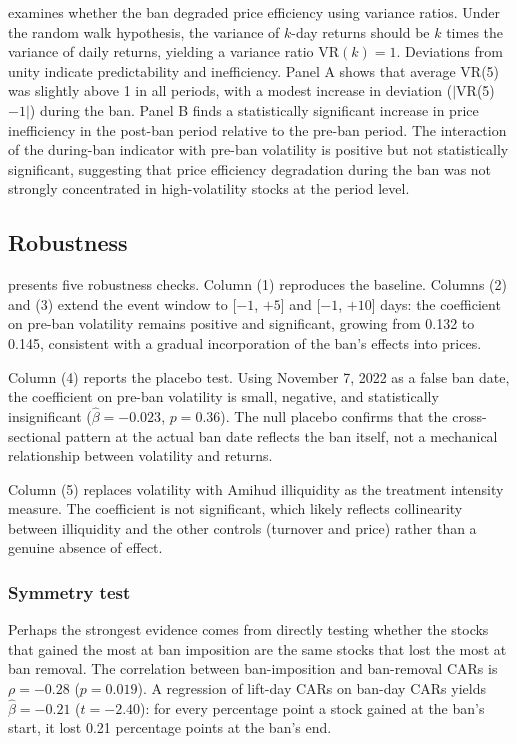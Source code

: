 \documentclass[12pt]{article}
\begin{document}


 examines whether the ban degraded price efficiency using variance ratios. Under the random walk hypothesis, the variance of $k$-day returns should be $k$ times the variance of daily returns, yielding a variance ratio VR$(k) = 1$. Deviations from unity indicate predictability and inefficiency. Panel A shows that average VR(5) was slightly above 1 in all periods, with a modest increase in deviation ($|$VR(5)$-1|$) during the ban. Panel B finds a statistically significant increase in price inefficiency in the post-ban period relative to the pre-ban period. The interaction of the during-ban indicator with pre-ban volatility is positive but not statistically significant, suggesting that price efficiency degradation during the ban was not strongly concentrated in high-volatility stocks at the period level.


\subsection{Robustness}



 presents five robustness checks. Column (1) reproduces the baseline. Columns (2) and (3) extend the event window to [$-1$, $+5$] and [$-1$, $+10$] days: the coefficient on pre-ban volatility remains positive and significant, growing from 0.132 to 0.145, consistent with a gradual incorporation of the ban's effects into prices.

Column (4) reports the placebo test. Using November 7, 2022 as a false ban date, the coefficient on pre-ban volatility is small, negative, and statistically insignificant ($\hat{\beta} = -0.023$, $p = 0.36$). The null placebo confirms that the cross-sectional pattern at the actual ban date reflects the ban itself, not a mechanical relationship between volatility and returns.

Column (5) replaces volatility with Amihud illiquidity as the treatment intensity measure. The coefficient is not significant, which likely reflects collinearity between illiquidity and the other controls (turnover and price) rather than a genuine absence of effect.

\subsubsection*{Symmetry test} Perhaps the strongest evidence comes from directly testing whether the stocks that gained the most at ban imposition are the same stocks that lost the most at ban removal. The correlation between ban-imposition and ban-removal CARs is $\rho = -0.28$ ($p = 0.019$). A regression of lift-day CARs on ban-day CARs yields $\hat{\beta} = -0.21$ ($t = -2.40$): for every percentage point a stock gained at the ban's start, it lost 0.21 percentage points at the ban's end.
\end{document}
